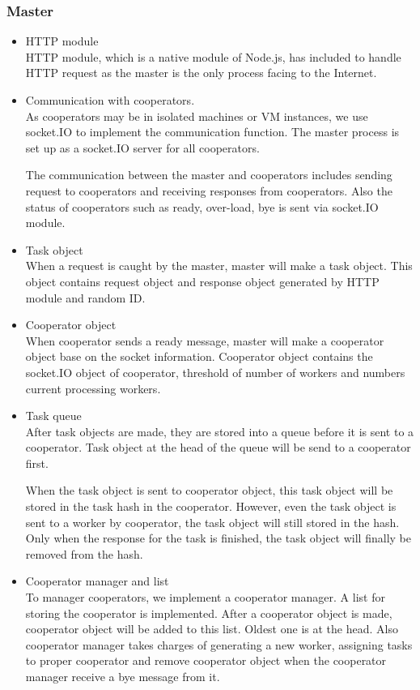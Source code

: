 \documentclass[JIP]{ipsj}
\begin{document}
\subsubsection{Master}
\begin{itemize}
	\item HTTP module\\
	HTTP module, which is a native module of Node.js, has included to handle HTTP request as the master is the only process facing to the Internet.

	\item Communication with cooperators.\\
	As cooperators may be in isolated machines or VM instances, we use socket.IO to implement the communication function. The master process is set up as a socket.IO server for all cooperators.

	The communication between the master and cooperators includes sending request to cooperators and receiving responses from cooperators. Also the status of cooperators such as ready, over-load, bye is sent via socket.IO module.

	\item Task object\\
	When a request is caught by the master, master will make a task object. This object contains request object and response object generated by HTTP module and random ID.

	\item Cooperator object\\
	When cooperator sends a ready message, master will make a cooperator object base on the socket information.
	Cooperator object contains the socket.IO object of cooperator, threshold of number of workers and numbers current processing workers.

	\item Task queue\\
	After task objects are made, they are stored into a queue before it is sent to a cooperator. Task object at the head of the queue will be send to a cooperator first. 

	When the task object is sent to cooperator object, this task object will be stored in the task hash in the cooperator. However, even the task object is sent to a worker by cooperator, the task object will still stored in the hash. Only when the response for the task is finished, the task object will finally be removed from the hash.

	\item Cooperator manager and list\\
	To manager cooperators, we implement a cooperator manager. A list for storing the cooperator is implemented.
	After a cooperator object is made, cooperator object will be added to this list. Oldest one is at the head.
	Also cooperator manager takes charges of generating a new worker, assigning tasks to proper cooperator and remove cooperator object when the cooperator manager receive a bye message from it.


\end{itemize}
\end{document}
